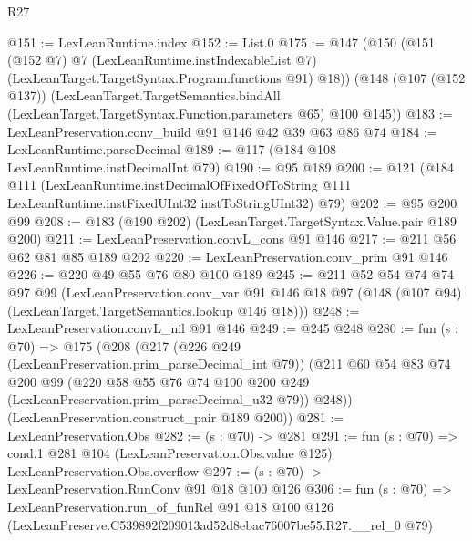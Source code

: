 \begin{lexlean}{R27}
\begin{coremodule}
@151 := LexLeanRuntime.index
@152 := List.{0}
@175 := @147
    (@150
      (@151
        (@152 @7)
        @7
        (LexLeanRuntime.instIndexableList @7)
        (LexLeanTarget.TargetSyntax.Program.functions @91)
        @18))
    (@148
      (@107 (@152 @137))
      (LexLeanTarget.TargetSemantics.bindAll
        (LexLeanTarget.TargetSyntax.Function.parameters @65)
        @100
        @145))
@183 := LexLeanPreservation.conv_build @91 @146 @42 @39 @63 @86 @74
@184 := LexLeanRuntime.parseDecimal
@189 := @117 (@184 @108 LexLeanRuntime.instDecimalInt @79)
@190 := @95 @189
@200 := @121
    (@184
      @111
      (LexLeanRuntime.instDecimalOfFixedOfToString
        @111
        LexLeanRuntime.instFixedUInt32
        instToStringUInt32)
      @79)
@202 := @95 @200 @99
@208 := @183 (@190 @202) (LexLeanTarget.TargetSyntax.Value.pair @189 @200)
@211 := LexLeanPreservation.convL_cons @91 @146
@217 := @211 @56 @62 @81 @85 @189 @202
@220 := LexLeanPreservation.conv_prim @91 @146
@226 := @220 @49 @55 @76 @80 @100 @189
@245 := @211
    @52
    @54
    @74
    @74
    @97
    @99
    (LexLeanPreservation.conv_var
      @91
      @146
      @18
      @97
      (@148 (@107 @94) (LexLeanTarget.TargetSemantics.lookup @146 @18)))
@248 := LexLeanPreservation.convL_nil @91 @146
@249 := @245 @248
@280 := fun (s : @70) =>
  @175
    (@208
      (@217
        (@226 @249 (LexLeanPreservation.prim_parseDecimal_int @79))
        (@211
          @60
          @54
          @83
          @74
          @200
          @99
          (@220 @58 @55 @76 @74 @100 @200 @249 (LexLeanPreservation.prim_parseDecimal_u32 @79))
          @248))
      (LexLeanPreservation.construct_pair @189 @200))
@281 := LexLeanPreservation.Obs
@282 := (s : @70) -> @281
@291 := fun (s : @70) =>
  cond.{1} @281 @104 (LexLeanPreservation.Obs.value @125) LexLeanPreservation.Obs.overflow
@297 := (s : @70) -> LexLeanPreservation.RunConv @91 @18 @100 @126
@306 := fun (s : @70) =>
  LexLeanPreservation.run_of_funRel
    @91
    @18
    @100
    @126
    (LexLeanPreserve.C539892f209013ad52d8ebac76007be55.R27.__rel_0 @79)
\end{coremodule}
\end{lexlean}
